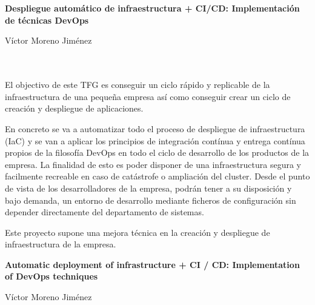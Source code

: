\chapter*{}





\cleardoublepage
\thispagestyle{empty}

\begin{center}
{\large\bfseries  Despliegue automático de infraestructura + CI/CD: Implementación de técnicas DevOps}\\
\end{center}
\begin{center}
Víctor Moreno Jiménez\\
\end{center}

\\

\vspace{0.7cm}
\\

El objectivo de este TFG es conseguir un ciclo rápido y replicable de la infraestructura de una pequeña empresa así como conseguir crear un ciclo de creación y despliegue de aplicaciones. 

\bigskip 
En concreto se va a automatizar todo el proceso de despliegue de infraestructura (IaC) y se van a aplicar los principios de integración contínua y entrega contínua propios de la filosofía DevOps en todo el ciclo de desarrollo de los productos de la empresa. La finalidad de esto es poder disponer de una infraestructura segura y facilmente recreable en caso de catástrofe o ampliación del cluster. Desde el punto de vista de los desarrolladores de la empresa, podrán tener a su disposición y bajo demanda, un entorno de desarrollo mediante ficheros de configuración sin depender directamente del departamento de sistemas. \bigskip

Este proyecto supone una mejora técnica en la creación y despliegue de infraestructura de la empresa.

\cleardoublepage


\thispagestyle{empty}


\begin{center}
{\large\bfseries Automatic deployment of infrastructure + CI / CD: Implementation of DevOps techniques}\\
\end{center}
\begin{center}
Víctor Moreno Jiménez\\
\end{center}

